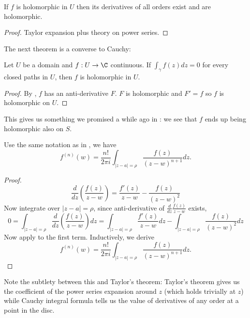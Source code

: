 \documentclass[a4paper]{article}
\begin{document}
\begin{corollary}
  If \(f\) is holomorphic in \(U\) then its derivatives of all orders exist and are holomorphic.
\end{corollary}

\begin{proof}
  Taylor expansion plus theory on power series.
\end{proof}

The next theorem is a converse to Cauchy:

\begin{corollary}[Morera]
  \label{cor:Morera}
  Let \(U\) be a domain and \(f: U \to \C\) continuous. If \(\int_\gamma f(z) dz = 0\) for every closed paths in \(U\), then \(f\) is holomorphic in \(U\).
\end{corollary}

\begin{proof}
  By , \(f\) has an anti-derivative \(F\). \(F\) is holomorphic and \(F' = f\) so \(f\) is holomorphic on \(U\).
\end{proof}

This gives us something we promised a while ago in : we see that \(f\) ends up being holomorphic also on \(S\).

\begin{proposition}
  \label{prop:Cauchy integral formula for derivatives}
  Use the same notation as in , we have
  \[
    f^{(n)}(w) = \frac{n!}{2\pi i} \int_{|z - a| = \rho} \frac{f(z)}{(z - w)^{n + 1}} dz.
  \]
\end{proposition}

\begin{proof}
\[
  \frac{d}{dz} \left( \frac{f(z)}{z - w} \right)
  = \frac{f'(z)}{z - w} - \frac{f(z)}{(z - w)^2}
\]
Now integrate over \(|z - a| = \rho\), since anti-derivative of \(\frac{d}{dz} \frac{f(z)}{z - w}\) exists,
\[
  0 = \int_{|z - a| = \rho}  \frac{d}{dz} \left( \frac{f(z)}{z - w} \right)dz
  = \int_{|z - a| = \rho} \frac{f'(z)}{z - w} dz - \int_{|z - a| = \rho} \frac{f(z)}{(z - w)^2} dz
\]
Now apply  to the first term. Inductively, we derive
\[
  f^{(n)}(w) = \frac{n!}{2\pi i} \int_{|z - a| = \rho} \frac{f(z)}{(z - w)^{n + 1}} dz.
\]
\end{proof}

Note the subtlety between this and Taylor's theorem: Taylor's theorem gives us the coefficient of the power series expansion around \(z\) (which holds trivially at \(z\)) while Cauchy integral formula tells us the value of derivatives of any order at a point in the disc.
\end{document}
